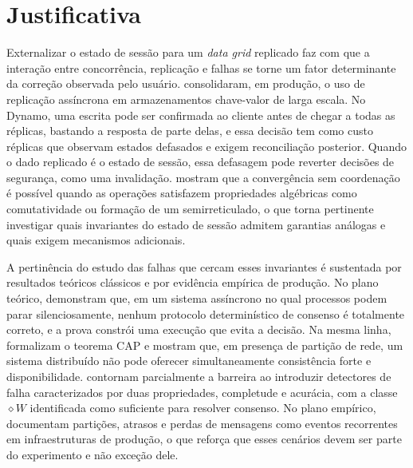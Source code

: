 \section{Justificativa}
\label{sec-justificativa}

Externalizar o estado de sessão para um \emph{data grid} replicado faz com que a interação entre concorrência, replicação e falhas se torne um fator determinante da correção observada pelo usuário. \citet{decandia_dynamo_2007} consolidaram, em produção, o uso de replicação assíncrona em armazenamentos chave-valor de larga escala. No Dynamo, uma escrita pode ser confirmada ao cliente antes de chegar a todas as réplicas, bastando a resposta de parte delas, e essa decisão tem como custo réplicas que observam estados defasados e exigem reconciliação posterior. Quando o dado replicado é o estado de sessão, essa defasagem pode reverter decisões de segurança, como uma invalidação. \citet{shapiro_crdt_2011} mostram que a convergência sem coordenação é possível quando as operações satisfazem propriedades algébricas como comutatividade ou formação de um semirreticulado, o que torna pertinente investigar quais invariantes do estado de sessão admitem garantias análogas e quais exigem mecanismos adicionais.

A pertinência do estudo das falhas que cercam esses invariantes é sustentada por resultados teóricos clássicos e por evidência empírica de produção. No plano teórico, \citet{fischer_lynch_paterson_flp_1985} demonstram que, em um sistema assíncrono no qual processos podem parar silenciosamente, nenhum protocolo determinístico de consenso é totalmente correto, e a prova constrói uma execução que evita a decisão. Na mesma linha, \citet{gilbert_lynch_cap_2002} formalizam o teorema CAP e mostram que, em presença de partição de rede, um sistema distribuído não pode oferecer simultaneamente consistência forte e disponibilidade. \citet{chandra_toueg_failure_detectors_1996} contornam parcialmente a barreira ao introduzir detectores de falha caracterizados por duas propriedades, completude e acurácia, com a classe $\diamond W$ identificada como suficiente para resolver consenso. No plano empírico, \citet{bailis_kingsbury_network_2014} documentam partições, atrasos e perdas de mensagens como eventos recorrentes em infraestruturas de produção, o que reforça que esses cenários devem ser parte do experimento e não exceção dele.


